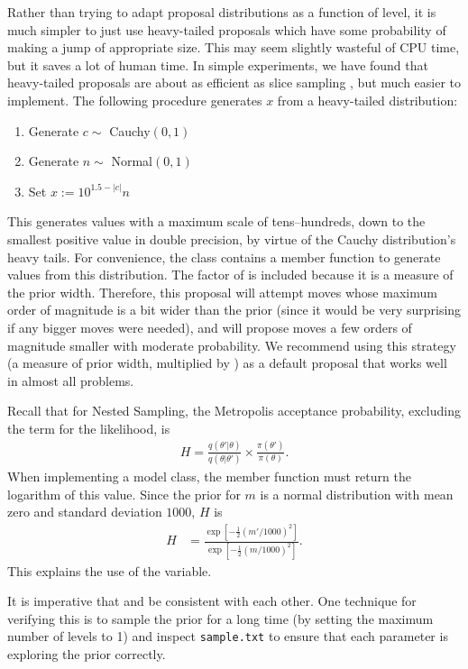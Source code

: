 \documentclass[article]{jss}
\newcommand{\params}{\theta}
\begin{document}
Rather than trying to adapt proposal distributions as a function of level,
it is much simpler to just use heavy-tailed proposals which have some
probability of making a jump of appropriate size. This may seem slightly
wasteful of CPU time, but it saves a lot of human time.
In simple experiments, we have found that heavy-tailed proposals are
about as efficient as slice sampling \citep{slice}, but much easier to
implement. The following procedure generates
$x$ from a heavy-tailed distribution:

\begin{enumerate}
\item Generate $c \sim$ Cauchy$(0, 1)$
\item Generate $n \sim$ Normal$(0, 1)$
\item Set $x := 10^{1.5 - |c|}n$
\end{enumerate}
This generates values with a maximum scale of tens--hundreds, down to
the smallest positive value in double precision, by virtue
of the Cauchy distribution's heavy tails.
For convenience, the  class contains a member function 
to generate values from this distribution.
The factor of  is included because it is a measure of the prior
width. Therefore, this proposal will attempt moves whose maximum order of
magnitude is a bit wider than the prior (since it would be very surprising
if any bigger moves were needed), and will propose moves a few orders of
magnitude smaller with moderate probability. We recommend using
this strategy (a measure of prior width, multiplied by ) as
a default proposal that works well in almost all problems.

Recall that for Nested Sampling, the Metropolis acceptance probability,
excluding the term for the likelihood, is
\begin{align}
H = \frac{q(\params'|\params)}{q(\params | \params')}
\times \frac{\pi(\params')}{\pi(\params)}.
\end{align}
When implementing a model class, the
member function must return the logarithm of this value.
Since the prior for $m$ is a normal distribution with
mean zero and standard deviation $1000$, $H$ is
\begin{align}
H &= \frac{\exp\left[-\frac{1}{2}(m'/1000)^2\right]}
{\exp\left[-\frac{1}{2}(m/1000)^2\right]}.
\end{align}
This explains the use of the  variable.

It is imperative that  and
be consistent with each other. One technique
for verifying this is to sample the prior for a long time
(by setting the maximum number of levels to 1) and inspect
{\tt sample.txt} to ensure that each parameter is exploring
the prior correctly.
\end{document}
